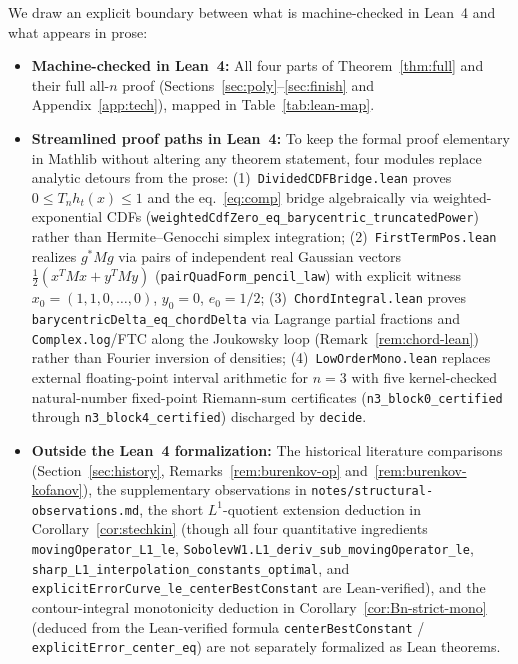 \documentclass[11pt,a4paper]{article}
\newcommand{\code}[1]{\nolinkurl{#1}}
\theoremstyle{remark}
\numberwithin{equation}{section}
\begin{document}
We draw an explicit boundary between what is machine-checked in Lean~4 and what appears in prose:
\begin{itemize}[leftmargin=1.8em]
    \item \textbf{Machine-checked in Lean~4:} All four parts of Theorem~\ref{thm:full} and their full all-$n$ proof (Sections~\ref{sec:poly}--\ref{sec:finish} and Appendix~\ref{app:tech}), mapped in Table~\ref{tab:lean-map}.
    \item \textbf{Streamlined proof paths in Lean~4:} To keep the formal proof elementary in Mathlib without altering any theorem statement, four modules replace analytic detours from the prose:
    (1)~\code{DividedCDFBridge.lean} proves $0 \le T_n h_t(x) \le 1$ and the eq.~\eqref{eq:comp} bridge algebraically via weighted-exponential CDFs (\code{weightedCdfZero_eq_barycentric_truncatedPower}) rather than Hermite--Genocchi simplex integration;
    (2)~\code{FirstTermPos.lean} realizes $g^* M g$ via pairs of independent real Gaussian vectors $\frac12(x^T M x + y^T M y)$ (\code{pairQuadForm_pencil_law}) with explicit witness $x_0 = (1, 1, 0, \dots, 0)$, $y_0 = 0$, $e_0 = 1/2$;
    (3)~\code{ChordIntegral.lean} proves \code{barycentricDelta_eq_chordDelta} via Lagrange partial fractions and \code{Complex.log}/FTC along the Joukowsky loop (Remark~\ref{rem:chord-lean}) rather than Fourier inversion of densities;
    (4)~\code{LowOrderMono.lean} replaces external floating-point interval arithmetic for $n = 3$ with five kernel-checked natural-number fixed-point Riemann-sum certificates (\code{n3_block0_certified} through \code{n3_block4_certified}) discharged by \code{decide}.
    \item \textbf{Outside the Lean~4 formalization:} The historical literature comparisons (Section~\ref{sec:history}, Remarks~\ref{rem:burenkov-op} and~\ref{rem:burenkov-kofanov}), the supplementary observations in \code{notes/structural-observations.md}, the short $L^1$-quotient extension deduction in Corollary~\ref{cor:stechkin} (though all four quantitative ingredients \code{movingOperator_L1_le}, \code{SobolevW1.L1_deriv_sub_movingOperator_le}, \code{sharp_L1_interpolation_constants_optimal}, and \code{explicitErrorCurve_le_centerBestConstant} are Lean-verified), and the contour-integral monotonicity deduction in Corollary~\ref{cor:Bn-strict-mono} (deduced from the Lean-verified formula \code{centerBestConstant} / \code{explicitError_center_eq}) are not separately formalized as Lean theorems.
\end{itemize}
\end{document}
